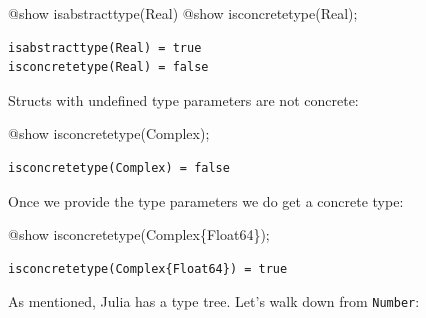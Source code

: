 \documentclass[
]{article}
\newenvironment{Shaded}{\begin{snugshade}}{\end{snugshade}}
\newcommand{\DataTypeTok}[1]{\textcolor[rgb]{0.68,0.00,0.00}{#1}}
\newcommand{\FunctionTok}[1]{\textcolor[rgb]{0.28,0.35,0.67}{#1}}
\newcommand{\NormalTok}[1]{\textcolor[rgb]{0.00,0.23,0.31}{#1}}
\newcommand{\PreprocessorTok}[1]{\textcolor[rgb]{0.68,0.00,0.00}{#1}}
\begin{document}
\begin{Shaded}
\begin{Highlighting}[]
\PreprocessorTok{@show} \FunctionTok{isabstracttype}\NormalTok{(}\DataTypeTok{Real}\NormalTok{)}
\PreprocessorTok{@show} \FunctionTok{isconcretetype}\NormalTok{(}\DataTypeTok{Real}\NormalTok{);}
\end{Highlighting}
\end{Shaded}

\begin{verbatim}
isabstracttype(Real) = true
isconcretetype(Real) = false
\end{verbatim}

Structs with undefined type parameters are not concrete:

\begin{Shaded}
\begin{Highlighting}[]
\PreprocessorTok{@show} \FunctionTok{isconcretetype}\NormalTok{(}\DataTypeTok{Complex}\NormalTok{);}
\end{Highlighting}
\end{Shaded}

\begin{verbatim}
isconcretetype(Complex) = false
\end{verbatim}

Once we provide the type parameters we do get a concrete type:

\begin{Shaded}
\begin{Highlighting}[]
\PreprocessorTok{@show} \FunctionTok{isconcretetype}\NormalTok{(}\DataTypeTok{Complex}\NormalTok{\{}\DataTypeTok{Float64}\NormalTok{\});}
\end{Highlighting}
\end{Shaded}

\begin{verbatim}
isconcretetype(Complex{Float64}) = true
\end{verbatim}

As mentioned, Julia has a type tree. Let's walk down from
\texttt{Number}:
\end{document}
